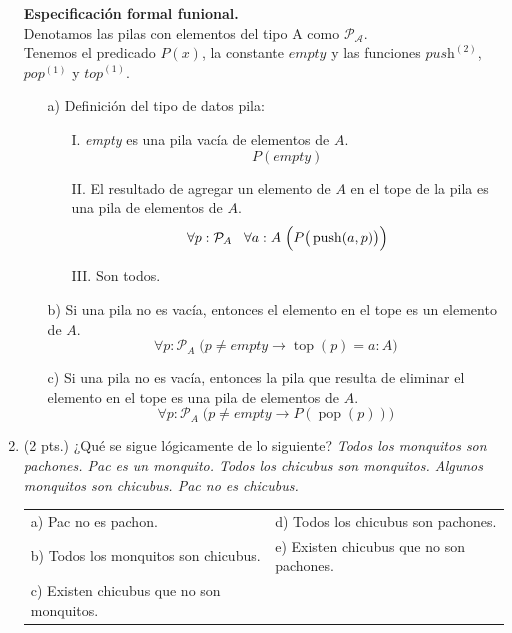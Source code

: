\documentclass[12pt,letterpaper]{article}
\newcommand{\imp}{\rightarrow}
\begin{document}
\begin{enumerate}
  \large{\textbf{Especificaci\'{o}n formal funional.}}\\
  Denotamos las pilas con elementos del tipo A como $\mathcal{P_A} $.\\
  Tenemos el predicado $P(x)$, la constante $\textit{empty}$ y las funciones $\textit{push}^{(2)}$, $\textit{pop}^{(1)}$ y $\textit{top}^{(1)}$.\\
  \begin{enumerate}
  \item[a)] Definición del tipo de datos pila:
    \begin{enumerate}
    \item[\footnotesize I.] \textit{empty} es una pila vacía de elementos de $A$.\\
      \[
      P(\textit{empty})
      \]
    \item[\footnotesize II.] El resultado de agregar un elemento de $A$ en el tope de la pila es una pila de elementos de $A$.\\
      \[
      \forall p : \mathcal{P}_A \hspace{3mm} \forall a : A \; \Big(P\big(\operatorname{push}(a, p)\big)\Big)
      \]
    \item[\footnotesize III.] Son todos.
    \end{enumerate}
  \item[b)] Si una pila no es vacía, entonces el elemento en el tope es un elemento de $A$.\\
    \[
     \forall p : \mathcal{P}_A \; \big(p \neq \textit{empty} \imp \operatorname{top}(p) = a : A\big)
    \]
  \item[c)] Si una pila no es vacía, entonces la pila que resulta de eliminar el elemento en el tope es una pila de elementos de $A$.\\
    \[
     \forall p : \mathcal{P}_A \; \big(p \neq \textit{empty} \imp P(\operatorname{pop}(p))\big)
    \]
  \end{enumerate}
  
  
\item (2 pts.) ¿Qué se sigue lógicamente de lo siguiente? \textit{Todos los monquitos son pachones. Pac es un monquito. Todos los chicubus son monquitos. Algunos monquitos son chicubus. Pac no es chicubus.}
  
  \vspace{0.2cm}
  
  \begin{center}
    \begin{tabular}{ll}
      a) Pac no es pachon. & d) Todos los chicubus son pachones. \\
      b) Todos los monquitos son chicubus. & e) Existen chicubus que no son pachones. \\
      c) Existen chicubus que no son monquitos. &
    \end{tabular}
  \end{center}
  

\end{enumerate}
\end{document}
